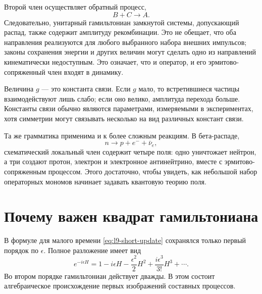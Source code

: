 Второй член осуществляет обратный процесс,
\begin{equation}
B+C\longrightarrow A.
\end{equation}
Следовательно, унитарный гамильтониан замкнутой системы, допускающий распад, также содержит амплитуду рекомбинации. Это не обещает, что оба направления реализуются для любого выбранного набора внешних импульсов; законы сохранения энергии и других величин могут сделать одно из направлений кинематически недоступным. Это означает, что и оператор, и его эрмитово-сопряженный член входят в динамику.

\begin{classroomqa}
\end{classroomqa}

Величина \(g\) — это константа связи. Если \(g\) мало, то встретившиеся частицы взаимодействуют лишь слабо; если оно велико, амплитуда перехода больше. Константы связи обычно являются параметрами, измеряемыми в экспериментах, хотя симметрии могут связывать несколько на вид различных констант связи.

Та же грамматика применима и к более сложным реакциям. В бета-распаде,
\begin{equation}
n\longrightarrow p+e^-+\bar\nu_e,
\end{equation}
схематический локальный член содержит четыре поля: одно уничтожает нейтрон, а три создают протон, электрон и электронное антинейтрино, вместе с эрмитово-сопряженным процессом. Этого достаточно, чтобы увидеть, как небольшой набор операторных мономов начинает задавать квантовую теорию поля.

\section{Почему важен квадрат гамильтониана}

В формуле для малого времени \eqref{eq:l9-short-update} сохранялся только первый порядок по \(\epsilon\). Полное разложение имеет вид
\begin{equation}
e^{-i\epsilon H}
=1-i\epsilon H-\frac{\epsilon^2}{2}H^2
+\frac{i\epsilon^3}{3!}H^3+\cdots.
\label{eq:l9-exponential}
\end{equation}
Во втором порядке гамильтониан действует дважды. В этом состоит алгебраическое происхождение первых изображений составных процессов.

